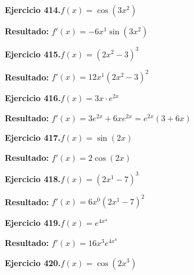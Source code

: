 \documentclass[10pt,a4paper]{article}
\begin{document}
\begin{ejbox}
\textbf{Ejercicio 414.}\quad $f(x) = \cos(3x^{2})$
\end{ejbox}

\begin{solbox}
\textbf{Resultado:} \(\displaystyle f'(x) = -6x^{1}\sin(3x^{2})\)
\end{solbox}

\newpage
\begin{ejbox}
\textbf{Ejercicio 415.}\quad $f(x) = (2x^{2} -3)^{3}$
\end{ejbox}

\begin{solbox}
\textbf{Resultado:} \(\displaystyle f'(x) = 12x^{1}(2x^{2} -3)^{2}\)
\end{solbox}

\begin{ejbox}
\textbf{Ejercicio 416.}\quad $f(x) = 3x \cdot e^{2x}$
\end{ejbox}

\begin{solbox}
\textbf{Resultado:} \(\displaystyle f'(x) = 3e^{2x} + 6xe^{2x} = e^{2x}(3 + 6x)\)
\end{solbox}

\begin{ejbox}
\textbf{Ejercicio 417.}\quad $f(x) = \sin(2x)$
\end{ejbox}

\begin{solbox}
\textbf{Resultado:} \(\displaystyle f'(x) = 2\cos(2x)\)
\end{solbox}

\newpage
\begin{ejbox}
\textbf{Ejercicio 418.}\quad $f(x) = (2x^{1} -7)^{3}$
\end{ejbox}

\begin{solbox}
\textbf{Resultado:} \(\displaystyle f'(x) = 6x^{0}(2x^{1} -7)^{2}\)
\end{solbox}

\begin{ejbox}
\textbf{Ejercicio 419.}\quad $f(x) = e^{4x^{4}}$
\end{ejbox}

\begin{solbox}
\textbf{Resultado:} \(\displaystyle f'(x) = 16x^{3}e^{4x^{4}}\)
\end{solbox}

\begin{ejbox}
\textbf{Ejercicio 420.}\quad $f(x) = \cos(2x^{3})$
\end{ejbox}
\end{document}
